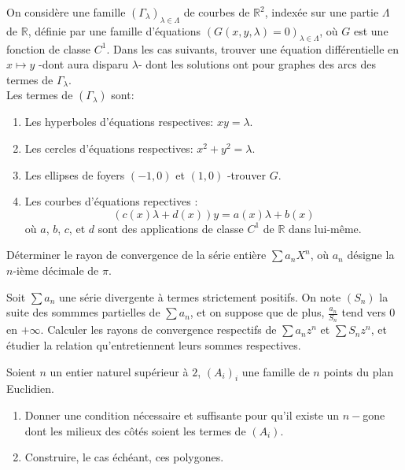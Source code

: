 \begin{exer}
On considère une famille $(\Gamma_{\lambda})_{\lambda \in \Lambda}$ de courbes de $\mathbb{R}^2$, %
indexée sur une partie $\Lambda$ de $\mathbb{R}$, %
définie par une famille d'équations $(G(x,y,\lambda)=0)_{\lambda \in \Lambda}$, %
où $G$ est une fonction de classe $C^{1}$. %
Dans les cas suivants, trouver une équation différentielle en $x \mapsto y$ -dont aura disparu $\lambda$- %
dont les solutions ont pour graphes des arcs des termes de $\Gamma_{\lambda}$.\\
Les termes de $(\Gamma_{\lambda})$ sont:
\begin{enumerate}
\item Les hyperboles d'équations respectives: $xy = \lambda$.
\item Les cercles d'équations respectives: $x^{2} + y^{2} = \lambda$.
\item Les ellipses de foyers $(-1,0)$ et $(1,0)$ -trouver $G$.
\item Les courbes d'équations repectives :
\[(c(x)\lambda + d(x))y = a(x)\lambda + b(x)\]
où $a$, $b$, $c$, et $d$ sont des applications de classe $C^{1}$ de $\mathbb{R}$ dans lui-même.
\end{enumerate}
\end{exer}

\begin{exer}
Déterminer le rayon de convergence de la série entière $\sum a_n X^n$, où $a_n$ désigne la $n$-ième décimale de $\pi$.
\end{exer}

\begin{exer}
Soit $\sum a_n$ une série divergente à termes strictement positifs. %
On note $(S_n)$ la suite des sommmes partielles de $\sum a_n$, et on suppose que de plus, %
$\frac{a_n}{S_n}$ tend vers $0$ en $+ \infty$. %
Calculer les rayons de convergence respectifs de $\sum a_n z^n$ et $\sum S_n z^n$, %
et étudier la relation qu'entretiennent leurs sommes respectives.
\end{exer}

\begin{exer}
Soient $n$ un entier naturel supérieur à $2$, $(A_i)_i$ une famille de $n$ points du plan Euclidien.
\begin{enumerate}
\item Donner une condition nécessaire et suffisante pour qu'il existe un $n-$gone %
dont les milieux des côtés soient les termes de $(A_i)$.
\item Construire, le cas échéant, ces polygones.
\end{enumerate}
\end{exer}

